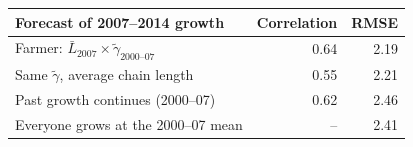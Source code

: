 \begin{tabular}{lrr}
\toprule
Forecast of 2007--2014 growth & Correlation & RMSE \\
\midrule
Farmer: $\bar L_{2007}\times\tilde\gamma_{2000\text{--}07}$ & 0.64 & 2.19 \\
Same $\tilde\gamma$, average chain length & 0.55 & 2.21 \\
Past growth continues (2000--07) & 0.62 & 2.46 \\
Everyone grows at the 2000--07 mean & -- & 2.41 \\
\bottomrule
\end{tabular}
